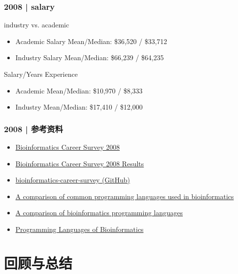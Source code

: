 \begin{frame}
  \frametitle{2008 | salary}
  \begin{block}{industry vs. academic}
    \begin{itemize}
      \item Academic Salary Mean/Median: \$36,520 / \$33,712
      \item Industry Salary Mean/Median: \$66,239 / \$64,235 
    \end{itemize}
  \end{block}
  \pause
  \begin{block}{Salary/Years Experience}
    \begin{itemize}
      \item Academic Mean/Median: \$10,970 / \$8,333
      \item Industry Mean/Median: \$17,410 / \$12,000 
    \end{itemize}
  \end{block}
\end{frame}

\begin{frame}
  \frametitle{2008 | 参考资料}
  \begin{itemize}
    \item \href{http://openwetware.org/wiki/Biogang:Projects/Bioinformatics\_Career\_Survey\_2008}{Bioinformatics Career Survey 2008}
    \item \href{http://openwetware.org/wiki/Biogang:Projects/Bioinformatics\_Career\_Survey\_2008\_Results}{Bioinformatics Career Survey 2008 Results}
    \item \href{https://github.com/michaelbarton/bioinformatics-career-survey}{bioinformatics-career-survey (GitHub)}
    \item \href{http://www.ncbi.nlm.nih.gov/pmc/articles/PMC2267699/}{A comparison of common programming languages used in bioinformatics} 
    \item \href{http://www.molecularecologist.com/2012/11/a-comparison-of-bioinformatics-programming-languages/}{A comparison of bioinformatics programming languages} 
    \item \href{https://nlcb.wordpress.com/2013/02/23/programming-languages-of-bioinformatics-2/}{Programming Languages of Bioinformatics} 
  \end{itemize}
\end{frame}

\section{回顾与总结}
